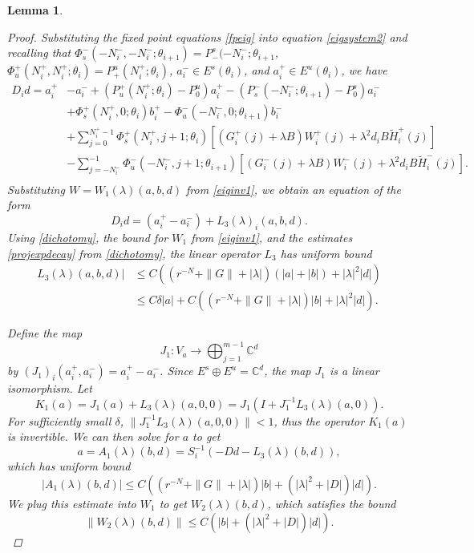 \documentclass[12pt]{elsarticle}
\def\C{{\mathbb C}}
\newtheorem{lemma}{Lemma}
\begin{document}
\begin{lemma}
\begin{proof}
Substituting the fixed point equations \cref{fpeig} into equation \cref{eigsystem2} and recalling that $\Phi_s^-(-N_i^-, -N_i^-; \theta_{i+1}) = P_-^s(-N_i^-; \theta_{i+1}$, $\Phi_u^+(N_i^+, N_i^+; \theta_i) = P_+^u(N_i^+; \theta_{i})$, $a_i^- \in E^s(\theta_i)$, and $a_i^+ \in E^u(\theta_i)$, we have
\begin{align}
D_i d = a_i^+ &- a_i^- + (P_u^+(N_i^+; \theta_i) - P_0^u) a_i^+ - (P_s^-(-N_i^-; \theta_{i+1}) - P_0^s) a_i^- \\
&+ \Phi_s^+(N_i^+, 0; \theta_i) b_i^+ - \Phi_u^-(-N_i^-, 0; \theta_{i+1}) b_i^- \nonumber \\
&+ \sum_{j = 0}^{N_i^+-1} \Phi_s^+(N_i^+, j+1; \theta_i) 
[(G_i^+(j) + \lambda B) W_i^+(j) + \lambda^2 d_i B \tilde{H}_i^+(j)] \nonumber \\
&- \sum_{j = -N_i^-}^{-1} \Phi_u^-(-N_i^-, j+1; \theta_{i+1}) 
[(G_i^-(j) + \lambda B) W_i^-(j) + \lambda^2 d_i B \tilde{H}_i^-(j)] . \nonumber \\
\end{align}
Substituting $W = W_1(\lambda)(a, b, d)$ from \cref{eiginv1}, we obtain an equation of the form 
\begin{equation}\label{Dideq2}
D_i d = (a_i^+ - a_i^-) + L_3(\lambda)_i(a,b,d).
\end{equation}
Using \cref{dichotomy}, the bound for $W_1$ from \cref{eiginv1}, and the estimates \cref{projexpdecay} from \cref{dichotomy}, the linear operator $L_3$ has uniform bound
\begin{align}\label{L3bound}
L_3(\lambda)(a,b,d)| &\leq C\left( (r^{-N} + \|G\| + |\lambda| ) (|a| + |b|) + |\lambda|^2 |d|  \right) \\
&\leq C \delta |a| + C\left( (r^{-N} + \|G\| + |\lambda| ) |b| + |\lambda|^2 |d|  \right) . \nonumber
\end{align}

Define the map
\[
J_1: V_a \rightarrow \bigoplus_{j=1}^{m-1} \C^d
\]
by $(J_1)_i(a_i^+, a_i^-) = a_i^+ - a_i^-$. Since $E^s \oplus E^u = \C^d$, the map $J_1$ is a linear isomorphism. Let
\[
K_1(a) = J_1 (a) + L_3(\lambda)(a, 0, 0) = J_1( I + J_1^{-1} L_3(\lambda)(a, 0) ).
\]
For sufficiently small $\delta$, $\|J_1^{-1} L_3(\lambda)(a, 0, 0)\| < 1$, thus the operator $K_1(a)$ is invertible. We can then solve for $a$ to get
\[
a = A_1(\lambda)(b, d) = S_i^{-1}(-D d - L_3(\lambda)(b, d)),
\]
which has uniform bound
\begin{equation*}
|A_1(\lambda)(b, d)| \leq C \left( (r^{-N} + \|G\| + |\lambda| ) |b| + (|\lambda|^2 + |D| ) |d|  \right).
\end{equation*}
We plug this estimate into $W_1$ to get $W_2(\lambda)(b,d)$, which satisfies the bound
\begin{equation*}
\|W_2(\lambda)(b,d)\| \leq C \left( |b| + (|\lambda|^2 + |D|) |d| \right).
\end{equation*}


\end{proof}
\end{lemma}
\end{document}

